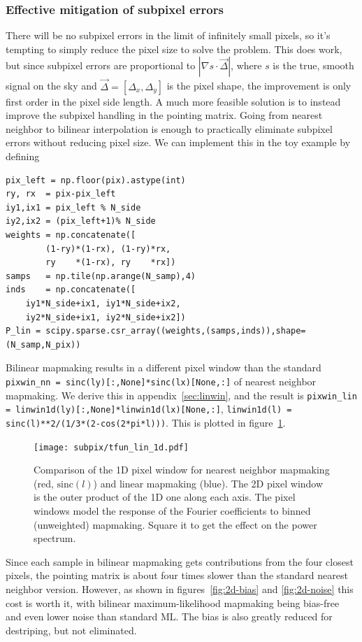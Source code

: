 \documentclass[twocolumn,apj]{aastex63}
\begin{document}
\subsubsection{Effective mitigation of subpixel errors}
There will be no subpixel errors in the limit of infinitely small pixels,
so it's tempting to simply reduce the pixel size to solve the problem. This
does work, but since subpixel errors are proportional to $|\nabla s \cdot \vec \Delta|$,
where $s$ is the true, smooth signal on the sky and $\vec \Delta = [\Delta_x,\Delta_y]$
is the pixel shape, the improvement is only first order in the pixel side length.
A much more feasible solution is to instead improve the subpixel handling in the
pointing matrix. Going from nearest neighbor to bilinear interpolation is enough
to practically eliminate subpixel errors without reducing pixel size. We can
implement this in the toy example by defining
\begin{lstlisting}
pix_left = np.floor(pix).astype(int)
ry, rx  = pix-pix_left
iy1,ix1 = pix_left % N_side
iy2,ix2 = (pix_left+1)% N_side
weights = np.concatenate([
		(1-ry)*(1-rx), (1-ry)*rx,
		ry    *(1-rx), ry    *rx])
samps   = np.tile(np.arange(N_samp),4)
inds    = np.concatenate([
	iy1*N_side+ix1, iy1*N_side+ix2,
	iy2*N_side+ix1, iy2*N_side+ix2])
P_lin = scipy.sparse.csr_array((weights,(samps,inds)),shape=(N_samp,N_pix))
\end{lstlisting}
Bilinear mapmaking results in a different pixel window than
the standard \lstinline{pixwin_nn = sinc(ly)[:,None]*sinc(lx)[None,:]}
of nearest neighbor mapmaking. We derive this in appendix~\ref{sec:linwin},
and the result is \lstinline{pixwin_lin = linwin1d(ly)[:,None]*linwin1d(lx)[None,:]},
\lstinline{linwin1d(l) = sinc(l)**2/(1/3*(2-cos(2*pi*l)))}. This is plotted in
figure~\ref{fig:linwin1d}.

\begin{figure}
	\centering
	\texttt{[image: subpix/tfun\_lin\_1d.pdf]}
	\caption{Comparison of the 1D pixel window for nearest neighbor
	mapmaking (red, $\text{sinc}(l)$) and linear mapmaking (blue). The 2D pixel window
	is the outer product of the 1D one along each axis. The pixel
	windows model the response of the Fourier coefficients to
	binned (unweighted) mapmaking. Square it to get the effect on
	the power spectrum.}
	\label{fig:linwin1d}
\end{figure}

Since each sample in bilinear mapmaking gets contributions from the four closest pixels,
the pointing matrix is about four times slower than the standard nearest neighbor
version. However, as shown in figures~\ref{fig:2d-bias} and \ref{fig:2d-noise}
this cost is worth it, with bilinear maximum-likelihood mapmaking being bias-free
and even lower noise than standard ML. The bias is also greatly reduced for
destriping, but not eliminated.
\end{document}
